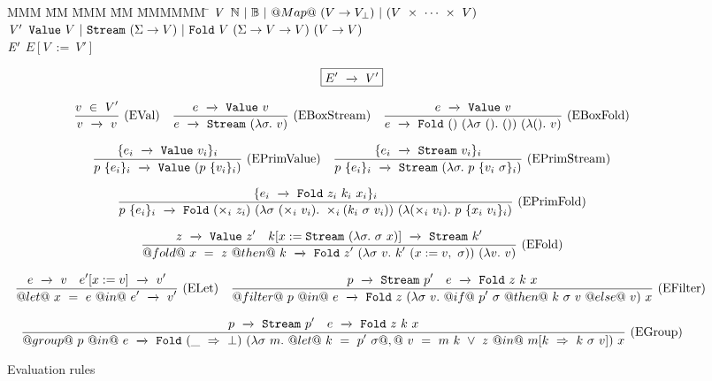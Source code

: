 
\begin{figure*}

\begin{tabbing}
MMM \= MM \= MMM \= MM \= MMMMMM \= \kill
$\mathit{V}$
\GrammarDef
  $\mathbb{N}~|~\mathbb{B}~|~@Map@~(V \to V_\bot)~|~(V~\times~\cdots~\times~V)$
\\
$\mathit{V'}$
\GrammarDef
  $\texttt{Value}~V~|~\texttt{Stream}~(\Sigma \to V)~|~\texttt{Fold}~V~(\Sigma \to V \to V)~(V \to V)$
\\
$\mathit{E'}$
\GrammarDef
  $E[V~:=~V']$
\\
\end{tabbing}

$$
\boxed{E' ~\xrightarrow~~ V'}
$$

$$
\enskip \frac {\displaystyle 
    v~\in~V'
} {\displaystyle 
    v ~\xrightarrow~~ v
} \  \mbox{(EVal)} \enskip
\enskip \frac {\displaystyle 
    e ~\xrightarrow~~ \texttt{Value}~v
} {\displaystyle 
    e ~\xrightarrow~~ \texttt{Stream}~(\lambda{}\sigma.~ v)
} \  \mbox{(EBoxStream)} \enskip
\enskip \frac {\displaystyle 
    e ~\xrightarrow~~ \texttt{Value}~v
} {\displaystyle 
    e ~\xrightarrow~~ \texttt{Fold}~()~(\lambda{}\sigma~().~ ())~(\lambda{}().~ v)
} \  \mbox{(EBoxFold)} \enskip
$$

$$
\enskip \frac {\displaystyle 
  \{ e_i ~\xrightarrow~~ \texttt{Value}~v_i \}_i
} {\displaystyle 
  p~\{ e_i \}_i  ~\xrightarrow~~ \texttt{Value}~(p~\{v_i\}_i)
} \  \mbox{(EPrimValue)} \enskip
\enskip \frac {\displaystyle 
  \{ e_i ~\xrightarrow~~ \texttt{Stream}~v_i \}_i
} {\displaystyle 
  p~\{ e_i \}_i  ~\xrightarrow~~ \texttt{Stream}~(\lambda{}\sigma.~ p~\{v_i~\sigma\}_i)
} \  \mbox{(EPrimStream)} \enskip
$$

$$
\enskip \frac {\displaystyle 
  \{ e_i ~\xrightarrow~~ \texttt{Fold}~z_i~k_i~x_i \}_i
} {\displaystyle 
  p~\{ e_i \}_i  ~\xrightarrow~~ \texttt{Fold}~(\times_i~z_i)~(\lambda{}\sigma~(\times_i~v_i).~
        \times_i (k_i~\sigma~v_i))~(\lambda{}(\times_i~v_i).~
        p~\{x_i~v_i\}_i)
} \  \mbox{(EPrimFold)} \enskip
$$

$$
\enskip \frac {\displaystyle 
  z ~\xrightarrow~~ \texttt{Value}~z'
  \quad
  k[x:=\texttt{Stream}~(\lambda{}\sigma.~ \sigma~x)] ~\xrightarrow~~ \texttt{Stream}~k'
} {\displaystyle 
  @fold@~x~=~z~@then@~k ~\xrightarrow~~ \texttt{Fold}~z'~(\lambda{}\sigma~v.~ k'~(x:=v,~\sigma))~(\lambda{}v.~ v)
} \  \mbox{(EFold)} \enskip
$$

$$
\enskip \frac {\displaystyle 
  e ~\xrightarrow~~ v
  \quad
  e'[x:=v] ~\xrightarrow~~ v'
} {\displaystyle 
  @let@~x~=~e~@in@~e' ~\xrightarrow~~ v'
} \  \mbox{(ELet)} \enskip
\enskip \frac {\displaystyle 
  p ~\xrightarrow~~ \texttt{Stream}~p'
  \quad
  e ~\xrightarrow~~ \texttt{Fold}~z~k~x
} {\displaystyle 
  @filter@~p~@in@~e ~\xrightarrow~~ \texttt{Fold}~z~(\lambda{}\sigma~v.~
         @if@~p'~\sigma~@then@~k~\sigma~v~@else@~v)~x
} \  \mbox{(EFilter)} \enskip
$$

$$
\ruleIN
{
  \SourceStepX{p}{\VStream{p'}}
  \quad
  \SourceStepX{e}{\VFold{z}{k}{x}}
}
{
  \SourceStepX
    {@group@~p~@in@~e}
    {\VFold
      {(\_~\Rightarrow~\bot)}
      {(\lam{\sigma~m}
        @let@~k~=~p'~\sigma@,@~
              v~=~m~k~\vee~z
        ~@in@~
          m[k~\Rightarrow~k~\sigma~v])}
      {x}}
}{EGroup}
$$


\caption{Evaluation rules}
\label{fig:source:eval}
\end{figure*}



